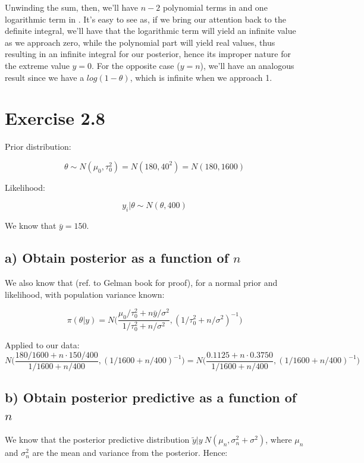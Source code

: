 \documentclass[]{article}
\begin{document}
Unwinding the sum, then, we'll have \(n-2\) polynomial terms in
\theta and one logarithmic term in \theta. It's easy to see as, if we
bring our attention back to the definite integral, we'll have that the
logarithmic term will yield an infinite value as we approach zero, while
the polynomial part will yield real values, thus resulting in an
infinite integral for our posterior, hence its improper nature for the
extreme value \(y=0\). For the opposite case (\(y=n\)), we'll have an
analogous result since we have a \(log(1-\theta)\), which is infinite
when we approach 1.

\section{Exercise 2.8}\label{exercise-2.8}

Prior distribution:

\[ \theta \sim N(\mu_0, \tau^2_0) = N(180, 40^2) = N(180, 1600) \]

Likelihood:

\[ y_i|\theta \sim N(\theta, 400)  \]

We know that \(\bar{y}=150\).

\subsection{\texorpdfstring{a) Obtain posterior as a function of
\(n\)}{a) Obtain posterior as a function of n}}\label{a-obtain-posterior-as-a-function-of-n}

We also know that (ref. to Gelman book for proof), for a normal prior
and likelihood, with population variance known:

\[
\pi(\theta|y) = N \bigg( \frac{\mu_0/ \tau^2_0 + n \bar{y} / \sigma^2}{1/ \tau^2_0 + n / \sigma^2},
    (1/\tau^2_0+n/\sigma^2)^{-1} \bigg)
\]

Applied to our data: \[
N\bigg(\frac{180/1600+n \cdot 150/400}{1/1600+n/400}, (1/1600+n/400)^{-1} \bigg)
=
N\bigg(\frac{0.1125+n \cdot 0.3750}{1/1600+n/400}, (1/1600+n/400)^{-1}\bigg)
\]

\subsection{\texorpdfstring{b) Obtain posterior predictive as a function
of
\(n\)}{b) Obtain posterior predictive as a function of n}}\label{b-obtain-posterior-predictive-as-a-function-of-n}

We know that the posterior predictive distribution
\(\tilde{y}|y ~ N(\mu_n, \sigma^2_n+\sigma^2)\), where \(\mu_n\) and
\(\sigma^2_n\) are the mean and variance from the posterior. Hence:
\end{document}
